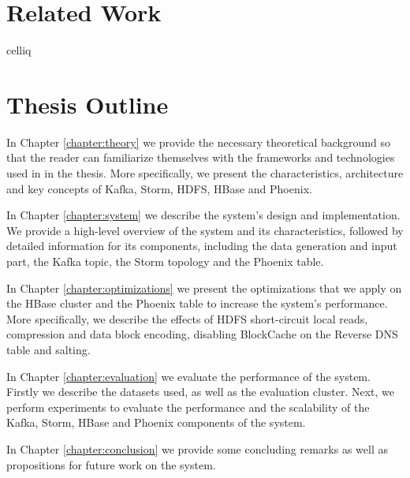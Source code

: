 \section{Related Work}

celliq

\section{Thesis Outline}

In Chapter \ref{chapter:theory} we provide the necessary theoretical background so that the reader can familiarize themselves with the frameworks and technologies used in in the thesis. More specifically, we present the characteristics, architecture and key concepts of Kafka, Storm, HDFS, HBase and Phoenix.

In Chapter \ref{chapter:system} we describe the system's design and implementation. We provide a high-level overview of the system and its characteristics, followed by detailed information for its components, including the data generation and input part, the Kafka topic, the Storm topology and the Phoenix table.

In Chapter \ref{chapter:optimizations} we present the optimizations that we apply on the HBase cluster and the Phoenix table to increase the system's performance. More specifically, we describe the effects of HDFS short-circuit local reads, compression and data block encoding, disabling BlockCache on the Reverse DNS table and salting.

In Chapter \ref{chapter:evaluation} we evaluate the performance of the system. Firstly we describe the datasets used, as well as the evaluation cluster. Next, we perform experiments to evaluate the performance and the scalability of the Kafka, Storm, HBase and Phoenix components of the system.

In Chapter \ref{chapter:conclusion} we provide some concluding remarks as well as propositions for future work on the system.


\cleardoublepage
